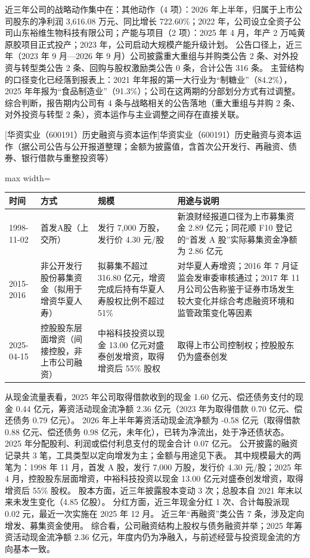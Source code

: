  近三年公司的战略动作集中在：其他动作（4 项）：2026 年上半年，归属于上市公司股东的净利润 3,616.08 万元、同比增长 722.60\%；2022 年，公司设立全资子公司山东裕维生物科技有限公司；产能与项目（2 项）：2025 年 4 月，年产 2 万吨黄原胶项目正式投产；2023 年，公司启动大规模产能升级计划。 公告口径上，近三年（2023 年 9 月---2026 年 9 月）公司披露重大重组与并购类公告 2 条、对外投资与转型类公告 2 条、回购与股权激励类公告 0 条，合计公告 316 条。 主营结构的口径变化已经落到报表上：2021 年年报的第一大行业为“制糖业”（84.2\%），2025 年年报为“食品制造业”（91.3\%）；公司在这两期的分部划分方式有过调整。 综合判断，报告期内公司有 4 条与战略相关的公告落地（重大重组与并购 2 条、对外投资与转型 2 条），资本运作与主业调整之间存在直接关联。

\begin{center}\small\setlength{\tabcolsep}{4pt}
[华资实业（600191）历史融资与资本运作]{华资实业（600191）历史融资与资本运作（据公司公告与公开报道整理；金额为披露值，含首次公开发行、再融资、债券、银行借款与重整投资等）}
\begin{adjustbox}{max width=\textwidth}
\begin{tabular}{@{}p{1.45cm}p{2.55cm}p{4.05cm}p{4.95cm}@{}}
\toprule
时间 & 方式 & 规模 & 用途与说明 \\
\midrule
1998-11-02 & 首发A股（上交所） & 发行 7,\allowbreak{}000 万股，\allowbreak{}发行价 4.30 元/\allowbreak{}股 & 新浪财经报道口径为上市募集资金 2.89 亿元；同花顺 F10 登记的“首发 A 股”实际募集资金净额为 2.86 亿元 \\
2015-2016 & 非公开发行股份募集资金（拟用于增资华夏人寿） & 拟募集不超过 316.80 亿元，\allowbreak{}增资完成后持有华夏人寿股权比例不超过 51\% & 对华夏人寿增资；2016 年 7 月证监会发审委审核通过；2017 年 11 月公司公告称鉴于证券市场发生较大变化并综合考虑融资环境和监管政策变化等因素 \\
2025-04-15 & 控股股东层面增资（间接控股，非上市公司融资） & 中裕科技投资以现金 13.00 亿元对盛泰创发增资，\allowbreak{}取得增资后 55\% 股权 & 取得上市公司控制权；控股股东仍为盛泰创发 \\
\bottomrule
\end{tabular}
\end{adjustbox}
\end{center}

 从现金流量表看，2025 年公司取得借款收到的现金 1.60 亿元、偿还债务支付的现金 0.44 亿元，筹资活动现金流净额 2.36 亿元（2023 年为取得借款 0.70 亿元、偿还债务 0.79 亿元）。 2026 年上半年筹资活动现金流净额为 -0.58 亿元（取得借款 0.88 亿元、偿还债务 0.98 亿元，未年化），已转为净流出，处于净还债状态。 2025 年分配股利、利润或偿付利息支付的现金合计 0.07 亿元。 公开披露的融资记录共 3 笔，工具类型以定向增发为主；金额与用途见下表。 其中规模最大的两笔为：1998 年 11 月，首发 A 股，发行 7,000 万股，发行价 4.30 元/股；2025 年 4 月，控股股东层面增资，中裕科技投资以现金 13.00 亿元对盛泰创发增资，取得增资后 55\% 股权。 股本方面，近三年披露股本变动 3 次；总股本自 2021 年末以来未发生变化（4.85 亿股）。 分红方面，近三年现金分红 1 次、合计每股派现 0.02 元，最近一次实施在 2025 年 12 月。 近三年“再融资”类公告 7 条，涉及定向增发、募集资金使用。 综合看，公司融资结构上股权与债务融资并举；2025 年筹资活动现金流净额 2.36 亿元，年度内仍为净融入，与前述经营与投资现金流的方向基本一致。

